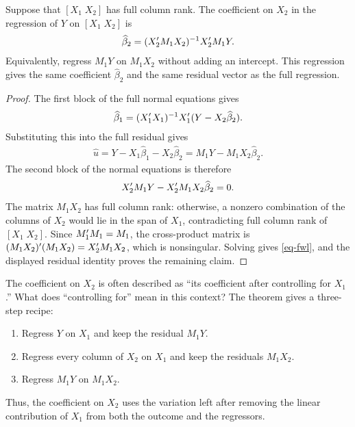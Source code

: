 \documentclass[a4paper,12pt]{article}
\begin{document}
\begin{theorem}\label{thm-fwl}
	Suppose that $[X_1\;X_2]$ has full column rank.
	The coefficient on $X_2$ in the regression of $Y$ on $[X_1\;X_2]$ is
	\begin{align}\label{eq-fwl}
		\widehat\beta_2=(X_2^{\prime} M_1X_2)^{-1} X_2^{\prime} M_1Y.
	\end{align}
	Equivalently, regress $M_1Y$ on $M_1X_2$ without adding an intercept.
	This regression gives the same coefficient $\widehat\beta_2$ and the same residual vector as the full regression.
\end{theorem}
\begin{proof}
	The first block of the full normal equations gives
	\begin{align*}
		\widehat\beta_1=(X_1^{\prime} X_1)^{-1} X_1^{\prime}(Y-X_2\widehat\beta_2).
	\end{align*}
	Substituting this into the full residual gives
	\begin{align*}
		\widehat u=Y-X_1\widehat\beta_1-X_2\widehat\beta_2
		=M_1Y-M_1X_2\widehat\beta_2.
	\end{align*}
	The second block of the normal equations is therefore
	\begin{align*}
		X_2^{\prime} M_1Y-X_2^{\prime} M_1X_2\widehat\beta_2=0.
	\end{align*}
	The matrix $M_1X_2$ has full column rank:
	otherwise, a nonzero combination of the columns of $X_2$ would lie in the span of $X_1$,
	contradicting full column rank of $[X_1\;X_2]$.
	Since $M_1^{\prime} M_1=M_1$, the cross-product matrix is
	$(M_1X_2)^{\prime}(M_1X_2)=X_2^{\prime} M_1X_2$, which is nonsingular.
	Solving gives \eqref{eq-fwl}, and the displayed residual identity proves the remaining claim.
\end{proof}

\begin{remark}
	The coefficient on $X_2$ is often described as ``its coefficient after controlling for $X_1$.''
	What does ``controlling for'' mean in this context?
	The theorem gives a three-step recipe:
	\begin{enumerate}
		\item Regress $Y$ on $X_1$ and keep the residual $M_1Y$.
		\item Regress every column of $X_2$ on $X_1$ and keep the residuals $M_1X_2$.
		\item Regress $M_1Y$ on $M_1X_2$.
	\end{enumerate}
	Thus, the coefficient on $X_2$ uses the variation left after removing the linear contribution of $X_1$ from both the outcome and the regressors.
\end{remark}
\end{document}
